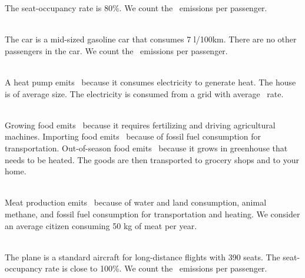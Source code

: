 \begin{enumerateb}
	The seat-occupancy rate is 80\%.
	We count the \COtwo\ emissions per passenger. \\
	\item {} \\
	The car is a mid-sized gasoline car that consumes 7 l/100km.
	There are no other passengers in the car.
	We count the \COtwo\ emissions per passenger. \\
	\item {} \\
	A heat pump emits \COtwo\ because it consumes electricity to generate heat.
	The house is of average size.
	The electricity is consumed from a grid with average \COtwo\ rate. \\
	\item {} \\
	Growing food emits \COtwo\  because it requires fertilizing and driving agricultural machines.
	Importing food emits \COtwo\ because of fossil fuel consumption for transportation.
	Out-of-season food emits \COtwo\ because it grows in greenhouse that needs to be heated.
	The goods are then transported to grocery shops and to your home. \\
	\item {} \\
	Meat production emits \COtwo\ because of water and land consumption, animal methane, and fossil fuel consumption for transportation and heating.
	We consider an average citizen consuming 50 kg of meat per year. \\
	\item {} \\
	The plane is a standard aircraft for long-distance flights with 390 seats.
	The seat-occupancy rate is close to 100\%.
	We count the \COtwo\ emissions per passenger. \\
	\item {} \\

\end{enumerateb}
